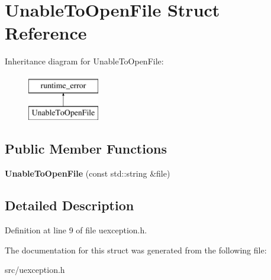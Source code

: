 \hypertarget{struct_unable_to_open_file}{}\section{Unable\+To\+Open\+File Struct Reference}
\label{struct_unable_to_open_file}
Inheritance diagram for Unable\+To\+Open\+File\+:\begin{figure}[H]
\begin{center}
\leavevmode
\includegraphics[height=2.000000cm]{struct_unable_to_open_file}
\end{center}
\end{figure}
\subsection*{Public Member Functions}
\begin{DoxyCompactItemize}
\item 
\mbox{\label{struct_unable_to_open_file_a0988369fcfe3f238d4f838548ac7f1f3}} 
{\bfseries Unable\+To\+Open\+File} (const std\+::string \&file)
\end{DoxyCompactItemize}


\subsection{Detailed Description}


Definition at line 9 of file uexception.\+h.



The documentation for this struct was generated from the following file\+:\begin{DoxyCompactItemize}
\item 
src/uexception.\+h\end{DoxyCompactItemize}
